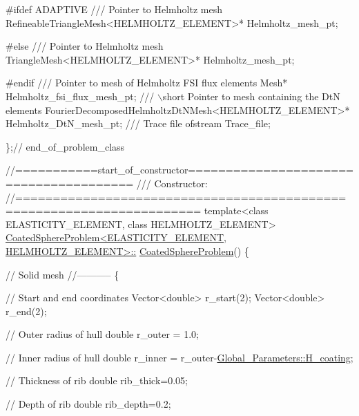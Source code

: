\begin{DoxyCodeInclude}
\textcolor{preprocessor}{#ifdef ADAPTIVE}
\textcolor{comment}{}
\textcolor{comment}{ /// Pointer to Helmholtz mesh}
\textcolor{comment}{} RefineableTriangleMesh<HELMHOLTZ\_ELEMENT>* Helmholtz\_mesh\_pt;

\textcolor{preprocessor}{#else}
\textcolor{comment}{}
\textcolor{comment}{ /// Pointer to Helmholtz mesh}
\textcolor{comment}{} TriangleMesh<HELMHOLTZ\_ELEMENT>* Helmholtz\_mesh\_pt;

\textcolor{preprocessor}{#endif}
\textcolor{comment}{}
\textcolor{comment}{ /// Pointer to mesh of Helmholtz FSI flux elements}
\textcolor{comment}{} Mesh* Helmholtz\_fsi\_flux\_mesh\_pt;
 \textcolor{comment}{}
\textcolor{comment}{ /// \(\backslash\)short Pointer to mesh containing the DtN elements}
\textcolor{comment}{} FourierDecomposedHelmholtzDtNMesh<HELMHOLTZ\_ELEMENT>* Helmholtz\_DtN\_mesh\_pt;
 \textcolor{comment}{}
\textcolor{comment}{ /// Trace file}
\textcolor{comment}{} ofstream Trace\_file;

\};\textcolor{comment}{// end\_of\_problem\_class}


\textcolor{comment}{//===========start\_of\_constructor======================================= }\textcolor{comment}{}
\textcolor{comment}{/// Constructor: }
\textcolor{comment}{}\textcolor{comment}{//====================================================================== }
\textcolor{keyword}{template}<\textcolor{keyword}{class} ELASTICITY\_ELEMENT, \textcolor{keyword}{class} HELMHOLTZ\_ELEMENT>
\hyperlink{classCoatedSphereProblem_ab9c983e7f0bed66f13d59bd65d6d151b}{CoatedSphereProblem<ELASTICITY\_ELEMENT, HELMHOLTZ\_ELEMENT>::}
\hyperlink{classCoatedSphereProblem_ab9c983e7f0bed66f13d59bd65d6d151b}{CoatedSphereProblem}() 
\{

 \textcolor{comment}{// Solid mesh}
 \textcolor{comment}{//-----------}
 \{

  \textcolor{comment}{// Start and end coordinates}
  Vector<double> r\_start(2);
  Vector<double> r\_end(2);
 
  \textcolor{comment}{// Outer radius of hull}
  \textcolor{keywordtype}{double} r\_outer = 1.0;

  \textcolor{comment}{// Inner radius of hull}
  \textcolor{keywordtype}{double} r\_inner = r\_outer-\hyperlink{namespaceGlobal__Parameters_ae3cf8878ede839bffda01f79bbe3e819}{Global\_Parameters::H\_coating};

  \textcolor{comment}{// Thickness of rib}
  \textcolor{keywordtype}{double} rib\_thick=0.05;
 
  \textcolor{comment}{// Depth of rib}
  \textcolor{keywordtype}{double} rib\_depth=0.2;


\end{DoxyCodeInclude}

